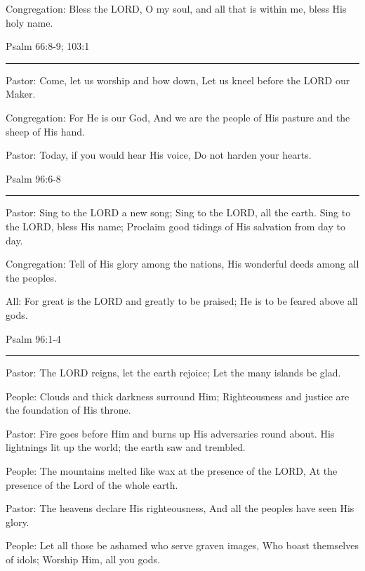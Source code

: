 \documentclass[]{book}
\begin{document}
Congregation: Bless the LORD, O my soul, and all that is within me,
bless His holy name.

Psalm 66:8-9; 103:1 \textbar{}

\begin{center}\rule{0.5\linewidth}{\linethickness}\end{center}

Pastor: Come, let us worship and bow down, Let us kneel before the LORD
our Maker.

Congregation: For He is our God, And we are the people of His pasture
and the sheep of His hand.

Pastor: Today, if you would hear His voice, Do not harden your hearts.

Psalm 96:6-8 \textbar{}

\begin{center}\rule{0.5\linewidth}{\linethickness}\end{center}

Pastor: Sing to the LORD a new song; Sing to the LORD, all the earth.
Sing to the LORD, bless His name; Proclaim good tidings of His salvation
from day to day.

Congregation: Tell of His glory among the nations, His wonderful deeds
among all the peoples.

All: For great is the LORD and greatly to be praised; He is to be feared
above all gods.

Psalm 96:1-4 \textbar{}

\begin{center}\rule{0.5\linewidth}{\linethickness}\end{center}

Pastor: The LORD reigns, let the earth rejoice; Let the many islands be
glad.

People: Clouds and thick darkness surround Him; Righteousness and
justice are the foundation of His throne.

Pastor: Fire goes before Him and burns up His adversaries round about.
His lightnings lit up the world; the earth saw and trembled.

People: The mountains melted like wax at the presence of the LORD, At
the presence of the Lord of the whole earth.

Pastor: The heavens declare His righteousness, And all the peoples have
seen His glory.

People: Let all those be ashamed who serve graven images, Who boast
themselves of idols; Worship Him, all you gods.
\end{document}
